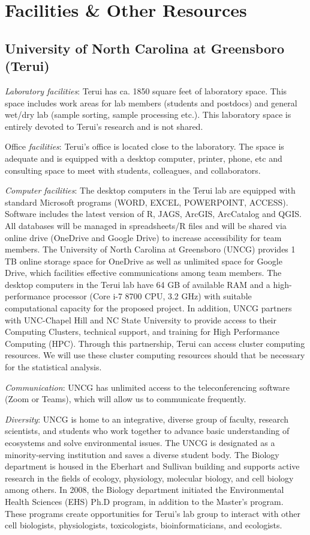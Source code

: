 \documentclass[12pt, class=article, crop=false]{standalone}
\begin{document}
\section*{Facilities \& Other Resources}

\subsection*{University of North Carolina at Greensboro (Terui)}

\textit{Laboratory facilities}: Terui has ca. 1850 square feet of laboratory space.
This space includes work areas for lab members (students and postdocs) and general wet/dry lab (sample sorting, sample processing etc.).
This laboratory space is entirely devoted to Terui's research and is not shared.

Office \textit{facilities}: Terui's office is located close to the laboratory.
The space is adequate and is equipped with a desktop computer, printer, phone, etc and consulting space to meet with students, colleagues, and collaborators.

\textit{Computer facilities}: The desktop computers in the Terui lab are equipped with standard Microsoft programs
(WORD, EXCEL, POWERPOINT, ACCESS).
Software includes the latest version of R, JAGS, ArcGIS, ArcCatalog and QGIS.
All databases will be managed in spreadsheets/R files and will be shared via online drive (OneDrive and Google Drive) to increase accessibility for team members.
The University of North Carolina at Greensboro (UNCG) provides 1 TB online storage space for OneDrive as well as unlimited space for Google Drive, which facilities effective communications among team members.
The desktop computers in the Terui lab have 64 GB of available RAM and a high-performance processor (Core i-7 8700 CPU, 3.2 GHz) with suitable computational capacity for the proposed project.
In addition, UNCG partners with UNC-Chapel Hill and NC State University to provide access to their Computing Clusters, technical support, and training for High Performance Computing (HPC).
Through this partnership, Terui can access cluster computing resources.
We will use these cluster computing resources should that be necessary for the statistical analysis.

\textit{Communication}: UNCG has unlimited access to the teleconferencing software (Zoom or Teams), which will allow us to communicate frequently.

\textit{Diversity}: UNCG is home to an integrative, diverse group of faculty, research scientists, and students who work together to advance basic understanding of ecosystems and solve environmental issues. The UNCG is designated as a minority-serving institution and saves a diverse student body.
The Biology department is housed in the Eberhart and Sullivan building
and supports active research in the fields of ecology, physiology, molecular biology, and cell biology among others.
In 2008, the Biology department initiated the Environmental Health Sciences (EHS) Ph.D program, in addition to the Master's program.
These programs create opportunities for Terui's lab group to interact with other cell biologists, physiologists, toxicologists, bioinformaticians, and ecologists.
\end{document}
